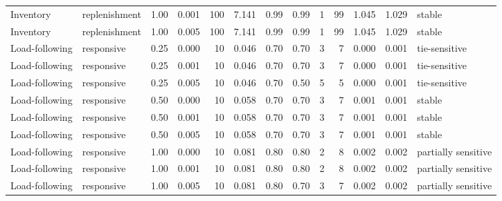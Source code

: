 \begin{tabular}{lllrrrrrrrrrl}
Inventory & replenishment & 1.00 & 0.001 & 100 & 7.141 & 0.99 & 0.99 & 1 & 99 & 1.045 & 1.029 & stable \\
Inventory & replenishment & 1.00 & 0.005 & 100 & 7.141 & 0.99 & 0.99 & 1 & 99 & 1.045 & 1.029 & stable \\
Load-following & responsive & 0.25 & 0.000 & 10 & 0.046 & 0.70 & 0.70 & 3 & 7 & 0.000 & 0.001 & tie-sensitive \\
Load-following & responsive & 0.25 & 0.001 & 10 & 0.046 & 0.70 & 0.70 & 3 & 7 & 0.000 & 0.001 & tie-sensitive \\
Load-following & responsive & 0.25 & 0.005 & 10 & 0.046 & 0.70 & 0.50 & 5 & 5 & 0.000 & 0.001 & tie-sensitive \\
Load-following & responsive & 0.50 & 0.000 & 10 & 0.058 & 0.70 & 0.70 & 3 & 7 & 0.001 & 0.001 & stable \\
Load-following & responsive & 0.50 & 0.001 & 10 & 0.058 & 0.70 & 0.70 & 3 & 7 & 0.001 & 0.001 & stable \\
Load-following & responsive & 0.50 & 0.005 & 10 & 0.058 & 0.70 & 0.70 & 3 & 7 & 0.001 & 0.001 & stable \\
Load-following & responsive & 1.00 & 0.000 & 10 & 0.081 & 0.80 & 0.80 & 2 & 8 & 0.002 & 0.002 & partially sensitive \\
Load-following & responsive & 1.00 & 0.001 & 10 & 0.081 & 0.80 & 0.80 & 2 & 8 & 0.002 & 0.002 & partially sensitive \\
Load-following & responsive & 1.00 & 0.005 & 10 & 0.081 & 0.80 & 0.70 & 3 & 7 & 0.002 & 0.002 & partially sensitive \\
\bottomrule
\end{tabular}
